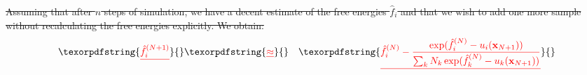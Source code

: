 \documentclass[9pt,review]{livecoms}
\newcommand{\vx}{\mathbf{x}}
\providecommand{\DIFdeltex}[1]{{\protect\color{red}\sout{#1}}}                      %
\providecommand{\DIFaddbegin}{} %
\providecommand{\DIFaddend}{} %
\providecommand{\DIFdelend}{} %
\providecommand{\DIFdel}[1]{\texorpdfstring{\DIFdeltex{#1}}{}} %
\newcommand{\DIFaddincludegraphics}[2][]{{\color{blue}\fbox{\DIFOincludegraphics[#1]{#2}}}} %
\DeclareRobustCommand{\DIFaddbegin}{\DIFOaddbegin \let\includegraphics\DIFaddincludegraphics} %
\DeclareRobustCommand{\DIFaddend}{\DIFOaddend \let\includegraphics\DIFOincludegraphics} %
\DeclareRobustCommand{\DIFdelend}{\DIFOaddend \let\includegraphics\DIFOincludegraphics} %
\begin{document}
\DIFdel{Assuming that after $n$ steps of simulation, we have a decent estimate of the free energies $\hat{f}_{i}$ and that we wish to add one more sample without recalculating the free energies explicitly. We obtain:
}\begin{align*}
\DIFdel{\hat{f}_{i}^{(N+1)} }&\DIFdel{\approx}& \DIFdel{\hat{f}_{i}^{(N)}- \frac{\exp(\hat{f}_{i}^{(N)}-u_i(\vx_{N+1}))}{\sum_k N_k \exp(\hat{f}_{k}^{(N)}-u_k(\vx_{N+1}))}
}\end{align*}
\DIFdelend \DIFaddbegin 
\DIFaddend 
\end{document}
